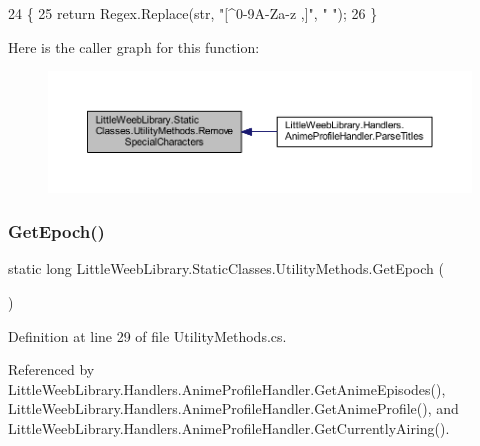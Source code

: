 \begin{DoxyCode}
24         \{           
25             \textcolor{keywordflow}{return} Regex.Replace(str, \textcolor{stringliteral}{"[^0-9A-Za-z ,]"}, \textcolor{stringliteral}{" "});
26         \}
\end{DoxyCode}
Here is the caller graph for this function\+:\nopagebreak
\begin{figure}[H]
\begin{center}
\leavevmode
\includegraphics[width=350pt]{class_little_weeb_library_1_1_static_classes_1_1_utility_methods_aa04235b1cf84b6741c496d8ecaea0eeb_icgraph}
\end{center}
\end{figure}
\mbox{\label{class_little_weeb_library_1_1_static_classes_1_1_utility_methods_a12336d9e64983ddabaad8950486fafb2}} 
\subsubsection{\texorpdfstring{Get\+Epoch()}{GetEpoch()}}
{\footnotesize\ttfamily static long Little\+Weeb\+Library.\+Static\+Classes.\+Utility\+Methods.\+Get\+Epoch (\begin{DoxyParamCaption}{ }\end{DoxyParamCaption})\hspace{0.3cm}{\ttfamily [static]}}



Definition at line 29 of file Utility\+Methods.\+cs.



Referenced by Little\+Weeb\+Library.\+Handlers.\+Anime\+Profile\+Handler.\+Get\+Anime\+Episodes(), Little\+Weeb\+Library.\+Handlers.\+Anime\+Profile\+Handler.\+Get\+Anime\+Profile(), and Little\+Weeb\+Library.\+Handlers.\+Anime\+Profile\+Handler.\+Get\+Currently\+Airing().


